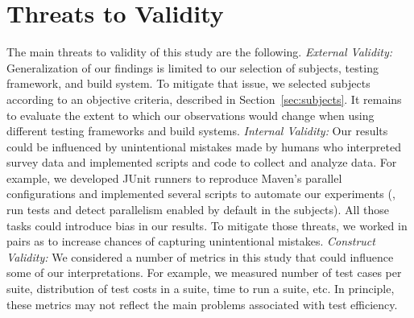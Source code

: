 \section{Threats to Validity}

The main threats to validity of this study are the following.
\textit{External Validity:} Generalization of our findings is limited
to our selection of subjects, testing framework, and build system.  To
mitigate that issue, we selected subjects according to an objective
criteria, described in Section~\ref{sec:subjects}.  It remains to
evaluate the extent to which our observations would change when using
different testing frameworks and build systems.
\textit{Internal Validity:} Our results could be influenced by
unintentional mistakes made by humans who interpreted survey data and
implemented scripts and code to collect and analyze data.
For example, we developed JUnit runners to reproduce Maven's parallel
configurations and implemented several scripts to automate our
experiments (\eg, run tests and detect parallelism enabled by default
in the subjects).
All those tasks could introduce bias in our results.
To mitigate those threats, we worked in pairs as to increase chances
of capturing unintentional mistakes.
\textit{Construct Validity:} We considered a number of metrics in this
study that could influence some of our interpretations.  For example,
we measured number of test cases per suite, distribution of test costs
in a suite, time to run a suite, etc.  In principle, these metrics may
not reflect the main problems associated with test
efficiency.

